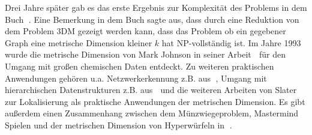 Drei Jahre später gab es das erste Ergebnis zur Komplexität des Problems in dem Buch \grqq$\;$\cite{book}. Eine Bemerkung in dem Buch sagte aus, dass durch eine Reduktion von dem Problem 3DM gezeigt werden kann, dass das Problem ob ein gegebener Graph eine metrische Dimension kleiner $k$ hat NP-vollständig ist. Im Jahre 1993 wurde die metrische Dimension von Mark Johnson in seiner Arbeit \grqq$\;$\cite{drug} für den Umgang mit großen chemischen Daten entdeckt. Zu weiteren praktischen Anwendungen gehören u.a. Netzwerkerkennung z.B. aus \grqq$\;$\cite{netzwerk}, Umgang mit hierarchischen Datenstrukturen z.B. aus \grqq$\;$\cite{hier} und die weiteren Arbeiten von Slater zur Lokalisierung als praktische Anwendungen der metrischen Dimension. Es gibt außerdem einen Zusammenhang zwischen dem Münzwiegeproblem, Mastermind Spielen und der metrischen Dimension von Hyperwürfeln in \grqq$\;$\cite{tannier}.\newpage

